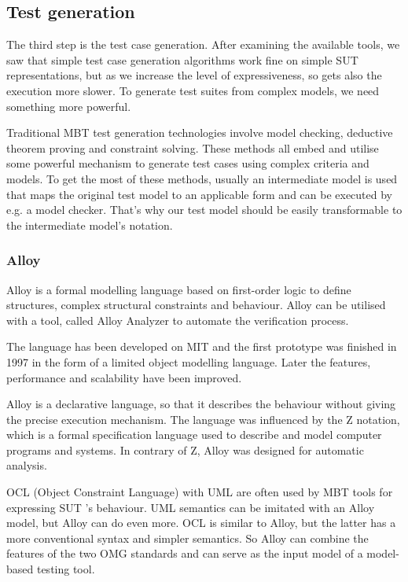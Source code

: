 
\subsection{Test generation}
\label{sub:designtestgeneration}

The third step is the test case generation. After examining the available tools, we saw that simple test case generation algorithms work fine on simple SUT representations, but as we increase the level of expressiveness, so gets also the execution more slower. To generate test suites from complex models, we need something more powerful.

Traditional MBT test generation technologies involve model checking, deductive theorem proving and constraint solving. These methods all embed and utilise some powerful mechanism to generate test cases using complex criteria and models. To get the most of these methods, usually an intermediate model is used that maps the original test model to an applicable form and can be executed by e.g. a model checker. That's why our test model should be easily transformable to the intermediate model's notation.

\subsubsection{Alloy}
\label{ssub:alloy}

Alloy \cite{alloy}\cite{alloyfirst}\cite{psm2alloy} is a formal modelling language based on first-order logic to define structures, complex structural constraints and behaviour. Alloy can be utilised with a tool, called Alloy Analyzer to automate the verification process.

The language has been developed on MIT and the first prototype was finished in 1997 in the form of a limited object modelling language. Later the features, performance and scalability have been improved.

Alloy is a declarative language, so that it describes the behaviour without giving the precise execution mechanism. The language was influenced by the Z notation, which is a formal specification language used to describe and model computer programs and systems. In contrary of Z, Alloy was designed for automatic analysis.

OCL (Object Constraint Language) with UML are often used by MBT tools for expressing SUT 's behaviour. UML semantics can be imitated with an Alloy model, but Alloy can do even more. OCL is similar to Alloy, but the latter has a more conventional syntax and simpler semantics. So Alloy can combine the features of the two OMG standards and can serve as the input model of a model-based testing tool.

